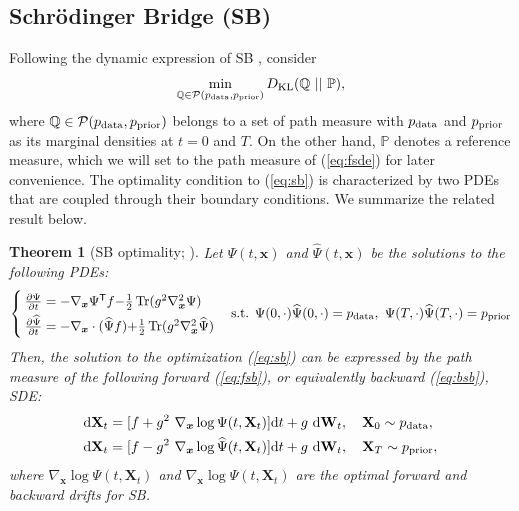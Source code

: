 \documentclass{article}
\def\eqref#1{(\ref{#1})}
\def\rd{{\textnormal{d}}}
\def\rvX{{\mathbf{X}}}
\def\vx{{\bm{x}}}
\newcommand{\pdata}{p_{\rm{data}}}
\newcommand{\KL}{D_{\mathrm{KL}}}
\DeclareMathOperator{\Tr}{Tr}
\def\wt{{ \mathbf{W}_t }}
\def\dwt{{ \mathrm{d} \wt }}
\def\dt{{ \mathrm{d} t }}
\def\calP{{\cal P}}
\newcommand{\fracpartial}[2]{\frac{\partial #1}{\partial  #2}}
\newcommand{\T}{\mathsf{T}}
\newtheorem{theorem}{Theorem}
\begin{document}
\subsection{Schr{\"o}dinger Bridge (SB)} \label{sec:2.2}

\def\QQ{{\mathbb{Q}}}
\def\PP{{\mathbb{P}}}
\def\zz{{\nabla_\vx \log {\Psi}}}
\def\zzhat{{\nabla_\vx \log \widehat{\Psi}}}


Following the dynamic expression of SB \citep{pavon1991free,dai1991stochastic},
consider \begin{align}
    \min_{\QQ \in \calP(\pdata, \prior)}
    \KL(\QQ~||~\PP),
    \label{eq:sb}
\end{align}
where $\QQ \in \calP(\pdata, \prior)$ belongs to a set of {path}
measure with $\pdata$ and ${ p_\text{\normalfont{prior}} }$ as its marginal densities at $t=0$ and $T$.
On the other hand, $\PP$ denotes a reference measure, which we will set to the path measure of
\eqref{eq:fsde} for later convenience.
The optimality condition to \eqref{eq:sb} is characterized by two PDEs that are coupled through their boundary conditions. We summarize the related result below. \begin{theorem}[SB optimality; \citet{chen2021stochastic,pavon1991free,caluya2021wasserstein}] \label{thm:1}
    Let $\Psi(t,\vx)$ and $\widehat{\Psi}(t,\vx)$ be
    the solutions to the following PDEs:
    \begin{align}
        \begin{cases}
        \fracpartial{\Psi}{t} = - \nabla_\vx \Psi^\T f {-} \frac{1}{2} \Tr(g^2\nabla^2_{\vx}\Psi) \\[3pt]
        \fracpartial{\widehat{\Psi}}{t} = - \nabla_\vx \cdot (\widehat{\Psi} f) {+} \frac{1}{2} \Tr(g^2\nabla^2_{\vx}\widehat{\Psi})
        \end{cases}
        \text{s.t. } \Psi(0,\cdot) \widehat{\Psi}(0,\cdot) = \pdata,~\Psi(T,\cdot) \widehat{\Psi}(T,\cdot) = \prior
        \label{eq:sb-pde}
    \end{align}
    Then, the solution to the optimization \eqref{eq:sb}
    can be expressed by the path measure of the following
    forward \eqref{eq:fsb}, or equivalently backward \eqref{eq:bsb}, SDE:
    \begin{subequations}
    \begin{align}
        \rd \rvX_t &= [f + g^2~\nabla_\vx \log {\Psi}(t,\rvX_t) ] \dt + g~\dwt,
        \quad \rvX_0 \sim \pdata,
        \label{eq:fsb}
        \\
        \rd \rvX_t &= [f - g^2~\nabla_\vx \log \widehat{\Psi}(t,\rvX_t) ] \dt + g~\dwt,
        \quad \rvX_T \sim \prior,
        \label{eq:bsb}
    \end{align} \label{eq:sb-sde}\end{subequations}
    where $\nabla_\vx \log {\Psi}(t,\rvX_t)$ and $\nabla_\vx \log \widehat{\Psi}(t,\rvX_t)$
    are the optimal forward and backward drifts for SB.
\end{theorem}
\end{document}
